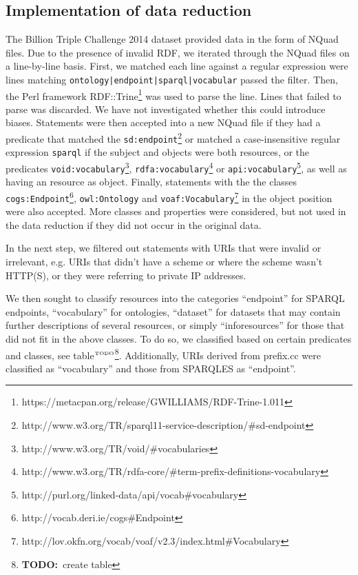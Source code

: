 \documentclass{llncs}
\newcommand{\rdfterm}[1]{\texttt{#1}}
\newcommand{\todo}[1]{\ensuremath{^{\textrm{\tiny{TODO}\normalsize}}}\footnote{\textbf{TODO:}~#1}}
\begin{document}

%
%
%



\begin{subappendices}
\renewcommand{\thesection}{\Alph{section}}%

\section{Implementation of data reduction}\label{app:reduction}

The Billion Triple Challenge 2014 dataset provided data in the form of
NQuad files. Due to the presence of invalid RDF, we iterated through
the NQuad files on a line-by-line basis. First, we matched each line
against a regular expression were lines matching
\texttt{ontology|endpoint|sparql|vocabular} passed the filter. Then,
the Perl framework
RDF::Trine\footnote{https://metacpan.org/release/GWILLIAMS/RDF-Trine-1.011} was used
to parse the line. Lines that failed to parse was discarded. We have
not investigated whether this could introduce biases. Statements were
then accepted into a new NQuad file if they had a predicate that
matched the
\rdfterm{sd:endpoint}\footnote{http://www.w3.org/TR/sparql11-service-description/\#sd-endpoint}
or matched a case-insensitive regular expression \texttt{sparql} if
the subject and objects were both resources, or the predicates
\rdfterm{void:vocabulary}\footnote{http://www.w3.org/TR/void/\#vocabularies},
\rdfterm{rdfa:vocabulary}\footnote{http://www.w3.org/TR/rdfa-core/\#term-prefix-definitions-vocabulary}
or
\rdfterm{api:vocabulary}\footnote{http://purl.org/linked-data/api/vocab\#vocabulary},
as well as having an resource as object. Finally, statements with the
the classes
\rdfterm{cogs:Endpoint}\footnote{http://vocab.deri.ie/cogs\#Endpoint},
\rdfterm{owl:Ontology} and
\rdfterm{voaf:Vocabulary}\footnote{http://lov.okfn.org/vocab/voaf/v2.3/index.html\#Vocabulary}
in the object position were also accepted. More classes and properties
were considered, but not used in the data reduction if they did not
occur in the original data.

In the next step, we filtered out statements with URIs that were
invalid or irrelevant, e.g. URIs that didn't have a scheme or where
the scheme wasn't HTTP(S), or they were referring to private IP addresses.

We then sought to classify resources into the categories ``endpoint''
for SPARQL endpoints, ``vocabulary'' for ontologies, ``dataset'' for
datasets that may contain further descriptions of several resources,
or simply ``inforesources'' for those that did not fit in the above
classes. To do so, we classified based on certain predicates and
classes, see table\todo{create table}. Additionally, URIs derived from
prefix.cc were classified as ``vocabulary'' and those from SPARQLES as
``endpoint''.


\end{subappendices}
\end{document}
